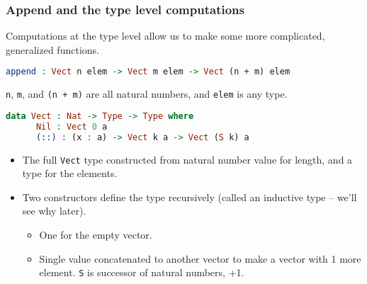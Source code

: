 \documentclass{beamer}
\begin{document}
\begin{frame}[fragile]
  \frametitle{Append and the type level computations}

  Computations at the type level allow us to make some more complicated, generalized functions.

  \pause

  \begin{lstlisting}[language=Idris]
    append : Vect n elem -> Vect m elem -> Vect (n + m) elem
  \end{lstlisting}

  \pause

  \texttt{n}, \texttt{m}, and \texttt{(n + m)} are all natural numbers, and \texttt{elem} is any type.

  \pause

  \begin{lstlisting}[language=Idris]
    data Vect : Nat -> Type -> Type where
      Nil : Vect 0 a
      (::) : (x : a) -> Vect k a -> Vect (S k) a
  \end{lstlisting}

  \begin{itemize}
  \pause
  \item The full \texttt{Vect} type constructed from natural number value for length, and a type for the elements.
  \pause
  \item Two constructors define the type recursively (called an inductive type -- we'll see why later).
    \begin{itemize}
    \item One for the empty vector.
    \item Single value concatenated to another vector to make a vector with 1 more element. \texttt{S} is successor of natural numbers, +1.
    \end{itemize}
  \end{itemize}
\end{frame}
\end{document}
